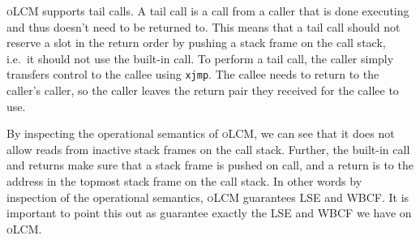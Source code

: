 \documentclass[acmsmall,review,showframe]{acmart}\settopmatter{printfolios=true,printccs=false,printacmref=false}
\newcommand{\srccm}{\textsc{oLCM}}
\begin{document}
\srccm{} supports tail calls.
A tail call is a call from a caller that is done executing and thus doesn't need to be returned to.
This means that a tail call should not reserve a slot in the return order by pushing a stack frame on the call stack, i.e.\ it should not use the built-in call.
To perform a tail call, the caller simply transfers control to the callee using \texttt{xjmp}.
The callee needs to return to the caller's caller, so the caller leaves the return pair they received for the callee to use.

By inspecting the operational semantics of \srccm{}, we can see that it does not allow reads from inactive stack frames on the call stack.
Further, the built-in call and returns make sure that a stack frame is pushed on call, and a return is to the address in the topmost stack frame on the call stack.
In other words by inspection of the operational semantics, \srccm{} guarantees LSE and WBCF.
It is important to point this out as \stktokens{} guarantee exactly the LSE and WBCF we have on \srccm{}.
\end{document}
